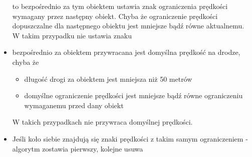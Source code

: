 \begin{itemize}
\begin{itemize}
\end{itemize}
to bezpośrednio za tym obiektem ustawia znak ograniczenia prędkości wymagany przez następny obiekt. Chyba że ograniczenie prędkości dopuszczalne dla następnego obiektu jest mniejsze bądź równe aktualnemu. W takim przypadku nie ustawia znaku
\item bezpośrednio za obiektem przywracana jest domyślna prędkość na drodze, chyba że 
\begin{itemize}
\item długość drogi za obiektem jest mniejsza niż 50 metrów
\item domyślne ograniczenie prędkości jest mniejsze bądź równe ograniczeniu wymaganemu przed dany obiekt
\end{itemize}
W takich przypadkach nie przywraca domyślnej prędkości.
\item Jeśli koło siebie znajdują się znaki prędkości z takim samym ograniczeniem - algorytm zostawia pierwszy, kolejne usuwa
\end{itemize}



